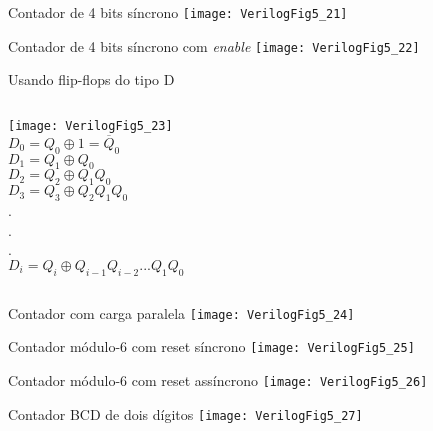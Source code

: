 \begin{frame}{Contador de 4 bits síncrono}   \centering
    \texttt{[image: VerilogFig5\_21]} \\
\end{frame}

\begin{frame}{Contador de 4 bits síncrono com \textit{enable}}   \centering
    \texttt{[image: VerilogFig5\_22]} \\
\end{frame}

\begin{frame}{Usando flip-flops do tipo D}   \centering
	\begin{columns}
    \texttt{[image: VerilogFig5\_23]} \\
        $D_0 = Q_0 \oplus 1 = \overline{Q}_0$ \\
        $D_1 = Q_1 \oplus Q_0$ \\
        $D_2 = Q_2 \oplus Q_1Q_0$ \\
        $D_3 = Q_3 \oplus Q_2Q_1Q_0$ \\
        . \\
        . \\
        . \\
        $D_i = Q_i \oplus Q_{i-1}Q_{i-2}...Q_1Q_0$ \\
    \end{columns}
\end{frame}

\begin{frame}{Contador com carga paralela}   \centering
    \texttt{[image: VerilogFig5\_24]} \\
\end{frame}

\begin{frame}{Contador módulo-6 com reset síncrono}   \centering
    \texttt{[image: VerilogFig5\_25]} \\
\end{frame}

\begin{frame}{Contador módulo-6 com reset assíncrono}   \centering
    \texttt{[image: VerilogFig5\_26]} \\
\end{frame}

\begin{frame}{Contador BCD de dois dígitos}   \centering
    \texttt{[image: VerilogFig5\_27]} \\
\end{frame}

